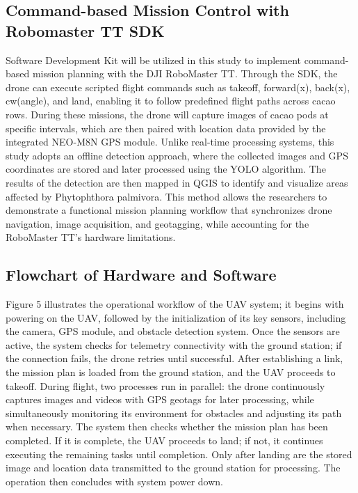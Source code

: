 	\subsection{Command-based Mission Control with Robomaster TT SDK}
	Software Development Kit will be utilized in this study to implement command-based mission planning with the DJI RoboMaster TT. Through the SDK, the drone can execute scripted flight commands such as takeoff, forward(x), back(x), cw(angle), and land, enabling it to follow predefined flight paths across cacao rows. During these missions, the drone will capture images of cacao pods at specific intervals, which are then paired with location data provided by the integrated NEO-M8N GPS module. Unlike real-time processing systems, this study adopts an offline detection approach, where the collected images and GPS coordinates are stored and later processed using the YOLO algorithm. The results of the detection are then mapped in QGIS to identify and visualize areas affected by Phytophthora palmivora. This method allows the researchers to demonstrate a functional mission planning workflow that synchronizes drone navigation, image acquisition, and geotagging, while accounting for the RoboMaster TT’s hardware limitations.
	
	\subsection{Flowchart of Hardware and Software}
	
	Figure 5 illustrates the operational workflow of the UAV system; it begins with powering on the UAV, followed by the initialization of its key sensors, including the camera, GPS module, and obstacle detection system. Once the sensors are active, the system checks for telemetry connectivity with the ground station; if the connection fails, the drone retries until successful. After establishing a link, the mission plan is loaded from the ground station, and the UAV proceeds to takeoff. During flight, two processes run in parallel: the drone continuously captures images and videos with GPS geotags for later processing, while simultaneously monitoring its environment for obstacles and adjusting its path when necessary. The system then checks whether the mission plan has been completed. If it is complete, the UAV proceeds to land; if not, it continues executing the remaining tasks until completion. Only after landing are the stored image and location data transmitted to the ground station for processing. The operation then concludes with system power down.
	
